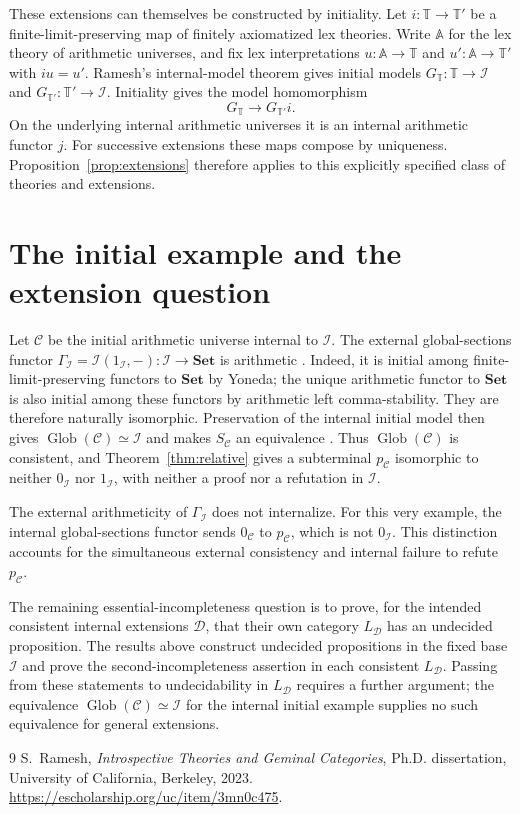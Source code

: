 \documentclass[10pt]{article}
\newcommand{\I}{\mathcal I}
\newcommand{\C}{\mathcal C}
\newcommand{\D}{\mathcal D}
\newcommand{\Glob}{\operatorname{Glob}}
\newcommand{\Set}{\mathbf{Set}}
\begin{document}
These extensions can themselves be constructed by initiality.
Let $i:\mathbb T\to\mathbb T'$ be a finite-limit-preserving
map of finitely axiomatized lex theories. Write $\mathbb A$ for
the lex theory of arithmetic universes, and fix lex interpretations
$u:\mathbb A\to\mathbb T$ and $u':\mathbb A\to\mathbb T'$
with $iu=u'$.
Ramesh's internal-model theorem
\cite[Theorem~1.63 and Observation~1.66]{Ramesh} gives initial
models $G_{\mathbb T}:\mathbb T\to\I$ and
$G_{\mathbb T'}:\mathbb T'\to\I$.
Initiality gives the model homomorphism
\[
 G_{\mathbb T}\longrightarrow G_{\mathbb T'}i.
\]
On the underlying internal arithmetic universes it is an internal
arithmetic functor $j$. For successive extensions these maps compose
by uniqueness. Proposition~\ref{prop:extensions} therefore applies
to this explicitly specified class of theories and extensions.

\section{The initial example and the extension question}

Let $\C$ be the initial arithmetic universe internal to $\I$.
The external global-sections functor
$\Gamma_\I=\I(1_\I,-):\I\to\Set$ is arithmetic
\cite[Theorem~1.80]{Ramesh}. Indeed, it is initial among
finite-limit-preserving functors to $\Set$ by Yoneda; the unique
arithmetic functor to $\Set$ is also initial among these functors
by arithmetic left comma-stability. They are therefore naturally
isomorphic. Preservation of the internal initial model then gives
$\Glob(\C)\simeq\I$ and makes $S_\C$ an equivalence
\cite[Observation~6.12]{Ramesh}.
Thus $\Glob(\C)$ is consistent, and Theorem~\ref{thm:relative}
gives a subterminal $p_\C$ isomorphic to neither $0_\I$ nor
$1_\I$, with neither a proof nor a refutation in $\I$.

The external arithmeticity of $\Gamma_\I$ does not internalize.
For this very example, the internal global-sections functor sends
$0_\C$ to $p_\C$, which is not $0_\I$.
This distinction accounts for the simultaneous external consistency
and internal failure to refute $p_\C$.

The remaining essential-incompleteness question is to prove, for the
intended consistent internal extensions $\D$, that their own
category $L_\D$ has an undecided proposition. The results above
construct undecided propositions in the fixed base $\I$ and prove
the second-incompleteness assertion in each consistent $L_\D$.
Passing from these statements to undecidability in $L_\D$ requires
a further argument; the equivalence $\Glob(\C)\simeq\I$ for the
internal initial example supplies no such equivalence for general
extensions.

\begin{thebibliography}{9}
 S.~Ramesh,
\emph{Introspective Theories and Geminal Categories},
Ph.D. dissertation, University of California, Berkeley, 2023.
\url{https://escholarship.org/uc/item/3mn0c475}.
\end{thebibliography}
\end{document}
